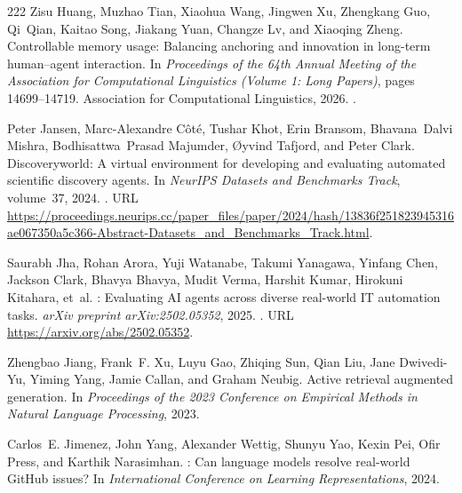 \begin{thebibliography}{222}
Zisu Huang, Muzhao Tian, Xiaohua Wang, Jingwen Xu, Zhengkang Guo, Qi~Qian,
  Kaitao Song, Jiakang Yuan, Changze Lv, and Xiaoqing Zheng.
\newblock Controllable memory usage: Balancing anchoring and innovation in
  long-term human--agent interaction.
\newblock In \emph{Proceedings of the 64th Annual Meeting of the Association
  for Computational Linguistics (Volume 1: Long Papers)}, pages 14699--14719.
  Association for Computational Linguistics, 2026.
\newblock {}.

Peter Jansen, Marc-Alexandre C{\^o}t{\'e}, Tushar Khot, Erin Bransom,
  Bhavana~Dalvi Mishra, Bodhisattwa~Prasad Majumder, {\O}yvind Tafjord, and
  Peter Clark.
\newblock Discoveryworld: A virtual environment for developing and evaluating
  automated scientific discovery agents.
\newblock In \emph{NeurIPS Datasets and Benchmarks Track}, volume~37, 2024.
\newblock {}.
\newblock URL
  \url{https://proceedings.neurips.cc/paper_files/paper/2024/hash/13836f251823945316ae067350a5c366-Abstract-Datasets_and_Benchmarks_Track.html}.

Saurabh Jha, Rohan Arora, Yuji Watanabe, Takumi Yanagawa, Yinfang Chen, Jackson
  Clark, Bhavya Bhavya, Mudit Verma, Harshit Kumar, Hirokuni Kitahara, et~al.
: Evaluating {AI} agents across diverse real-world {IT}
  automation tasks.
\newblock \emph{arXiv preprint arXiv:2502.05352}, 2025.
\newblock {}.
\newblock URL \url{https://arxiv.org/abs/2502.05352}.

Zhengbao Jiang, Frank~F. Xu, Luyu Gao, Zhiqing Sun, Qian Liu, Jane Dwivedi-Yu,
  Yiming Yang, Jamie Callan, and Graham Neubig.
\newblock Active retrieval augmented generation.
\newblock In \emph{Proceedings of the 2023 Conference on Empirical Methods in
  Natural Language Processing}, 2023.

Carlos~E. Jimenez, John Yang, Alexander Wettig, Shunyu Yao, Kexin Pei, Ofir
  Press, and Karthik Narasimhan.
: Can language models resolve real-world {GitHub} issues?
\newblock In \emph{International Conference on Learning Representations}, 2024.


\end{thebibliography}
